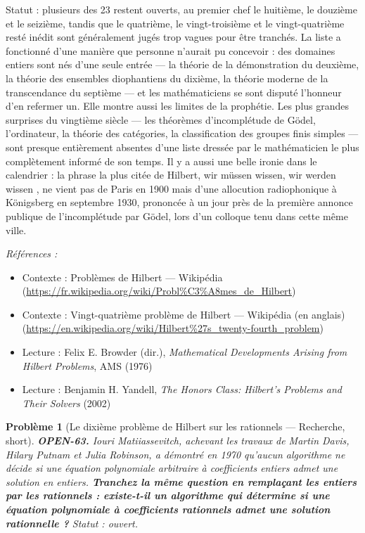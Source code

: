 \documentclass[11pt]{article}
\newtheorem{problem}{Problème}
\newenvironment{refs}{\par\small\noindent\emph{Références :}\begin{itemize}\setlength\itemsep{0pt}}{\end{itemize}\normalsize}
\begin{document}
\noindent Statut : plusieurs des 23 restent ouverts, au premier chef le huitième,
le douzième et le seizième, tandis que le quatrième, le vingt-troisième et le
vingt-quatrième resté inédit sont généralement jugés trop vagues pour être tranchés. La
liste a fonctionné d'une manière que personne n'aurait pu concevoir : des domaines entiers
sont nés d'une seule entrée --- la théorie de la démonstration du deuxième, la théorie des
ensembles diophantiens du dixième, la théorie moderne de la transcendance du septième --- et
les mathématiciens se sont disputé l'honneur d'en refermer un. Elle montre aussi les
limites de la prophétie. Les plus grandes surprises du vingtième siècle --- les théorèmes
d'incomplétude de Gödel, l'ordinateur, la théorie des catégories, la classification des
groupes finis simples --- sont presque entièrement absentes d'une liste dressée par le
mathématicien le plus complètement informé de son temps. Il y a aussi une belle ironie dans
le calendrier : la phrase la plus citée de Hilbert, \og{} wir müssen wissen, wir werden wissen \fg{},
ne vient pas de Paris en 1900 mais d'une allocution radiophonique à Königsberg en septembre
1930, prononcée à un jour près de la première annonce publique de l'incomplétude par Gödel,
lors d'un colloque tenu dans cette même ville.

\begin{refs}
\item Contexte : Problèmes de Hilbert --- Wikipédia (\url{https://fr.wikipedia.org/wiki/Probl%C3%A8mes_de_Hilbert})
\item Contexte : Vingt-quatrième problème de Hilbert --- Wikipédia (en anglais) (\url{https://en.wikipedia.org/wiki/Hilbert%27s_twenty-fourth_problem})
\item Lecture : Felix E. Browder (dir.), \textit{Mathematical Developments Arising from Hilbert Problems}, AMS (1976)
\item Lecture : Benjamin H. Yandell, \textit{The Honors Class: Hilbert's Problems and Their Solvers} (2002)
\end{refs}

\bigskip

\begin{problem}[{Le dixième problème de Hilbert sur les rationnels --- Recherche, short}]
\textbf{OPEN-63.} Iouri Matiiassevitch, achevant les travaux de Martin
Davis, Hilary Putnam et Julia Robinson, a démontré en 1970 qu'aucun algorithme ne décide si
une équation polynomiale arbitraire à coefficients entiers admet une solution en
\textit{entiers}. \textbf{Tranchez la même question en remplaçant les entiers par les rationnels :
existe-t-il un algorithme qui détermine si une équation polynomiale à coefficients
rationnels admet une solution rationnelle ?} Statut : ouvert.
\end{problem}
\end{document}
